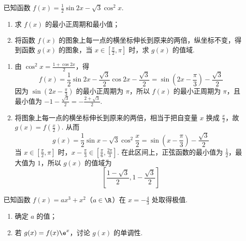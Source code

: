 \begin{problem}
已知函数 \(f(x) = \frac{1}{2}\sin 2x - \sqrt{3}\cos^2 x\).

\begin{enumerate}
\item 求 \(f(x)\) 的最小正周期和最小值；
\item 将函数 \(f(x)\) 的图象上每一点的横坐标伸长到原来的两倍，纵坐标不变，得到函数 \(g(x)\) 的图象，当 \(x \in \left[\frac{\pi}{2}, \pi\right]\) 时，求 \(g(x)\) 的值域.
\end{enumerate}
\end{problem}

\begin{solution}
\begin{enumerate}
\item 由 \(\cos^2x=\frac{1+\cos2x}{2}\)，得
\[
f(x)=\frac{1}{2}\sin2x-\frac{\sqrt{3}}{2}\cos2x-\frac{\sqrt{3}}{2}=\sin\left(2x-\frac{\pi}{3}\right)-\frac{\sqrt{3}}{2}
\]
因为 \(\sin\left(2x-\frac{\pi}{3}\right)\) 的最小正周期为 \(\pi\)，所以 \(f(x)\) 的最小正周期为 \(\pi\)，且最小值为 \(-1-\frac{\sqrt{3}}{2}=-\frac{2+\sqrt{3}}{2}\).
\item 将图象上每一点的横坐标伸长到原来的两倍，相当于把自变量 \(x\) 换成 \(\frac{x}{2}\)，故 \(g(x)=f\left(\frac{x}{2}\right)\). 从而
\[
g(x)=\frac{1}{2}\sin x-\sqrt{3}\cos^2\frac{x}{2}=\sin\left(x-\frac{\pi}{3}\right)-\frac{\sqrt{3}}{2}
\]
当 \(x\in\left[\frac{\pi}{2},\pi\right]\) 时，\(x-\frac{\pi}{3}\in\left[\frac{\pi}{6},\frac{2\pi}{3}\right]\). 在此区间上，正弦函数的最小值为 \(\frac{1}{2}\)，最大值为 \(1\)，所以 \(g(x)\) 的值域为
\[
\left[\frac{1-\sqrt{3}}{2},1-\frac{\sqrt{3}}{2}\right]
\]
\end{enumerate}
\end{solution}

\begin{problem}
已知函数 \(f(x) = ax^3 + x^2\)（\(a \in \R\)）在 \(x = -\frac{4}{3}\) 处取得极值.

\begin{enumerate}
\item 确定 \(a\) 的值；
\item 若 \(g(x) = f(x)\e^{x}\)，讨论 \(g(x)\) 的单调性.
\end{enumerate}
\end{problem}

